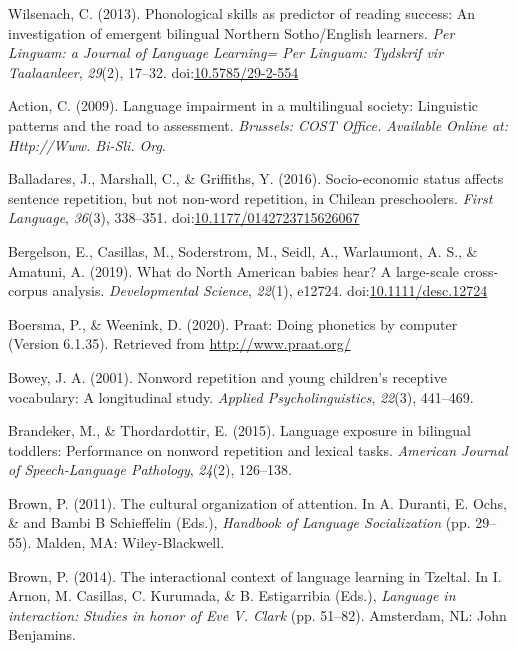 \documentclass[english,,man,floatsintext]{apa6}
\begin{document}
\hypertarget{ref-wilsenach2013phonological}{}
Wilsenach, C. (2013). Phonological skills as predictor of reading
success: An investigation of emergent bilingual Northern Sotho/English
learners. \emph{Per Linguam: a Journal of Language Learning= Per
Linguam: Tydskrif vir Taalaanleer}, \emph{29}(2), 17--32.
doi:\href{https://doi.org/10.5785/29-2-554}{10.5785/29-2-554}

\hypertarget{ref-is08042009language}{}
Action, C. (2009). Language impairment in a multilingual society:
Linguistic patterns and the road to assessment. \emph{Brussels: COST
Office. Available Online at: Http://Www. Bi-Sli. Org}.

\hypertarget{ref-balladares2016socio}{}
Balladares, J., Marshall, C., \& Griffiths, Y. (2016). Socio-economic
status affects sentence repetition, but not non-word repetition, in
Chilean preschoolers. \emph{First Language}, \emph{36}(3), 338--351.
doi:\href{https://doi.org/10.1177/0142723715626067}{10.1177/0142723715626067}

\hypertarget{ref-bergelsoncasillas2019what}{}
Bergelson, E., Casillas, M., Soderstrom, M., Seidl, A., Warlaumont, A.
S., \& Amatuni, A. (2019). What do North American babies hear? A
large-scale cross-corpus analysis. \emph{Developmental Science},
\emph{22}(1), e12724.
doi:\href{https://doi.org/10.1111/desc.12724}{10.1111/desc.12724}

\hypertarget{ref-Praat}{}
Boersma, P., \& Weenink, D. (2020). Praat: Doing phonetics by computer
(Version 6.1.35). Retrieved from \url{http://www.praat.org/}

\hypertarget{ref-bowey2001nonword}{}
Bowey, J. A. (2001). Nonword repetition and young children's receptive
vocabulary: A longitudinal study. \emph{Applied Psycholinguistics},
\emph{22}(3), 441--469.

\hypertarget{ref-brandeker2015language}{}
Brandeker, M., \& Thordardottir, E. (2015). Language exposure in
bilingual toddlers: Performance on nonword repetition and lexical tasks.
\emph{American Journal of Speech-Language Pathology}, \emph{24}(2),
126--138.

\hypertarget{ref-brown2011cultural}{}
Brown, P. (2011). The cultural organization of attention. In A. Duranti,
E. Ochs, \& and Bambi B Schieffelin (Eds.), \emph{Handbook of Language
Socialization} (pp. 29--55). Malden, MA: Wiley-Blackwell.

\hypertarget{ref-brown2014interactional}{}
Brown, P. (2014). The interactional context of language learning in
Tzeltal. In I. Arnon, M. Casillas, C. Kurumada, \& B. Estigarribia
(Eds.), \emph{Language in interaction: Studies in honor of Eve V. Clark}
(pp. 51--82). Amsterdam, NL: John Benjamins.
\end{document}
